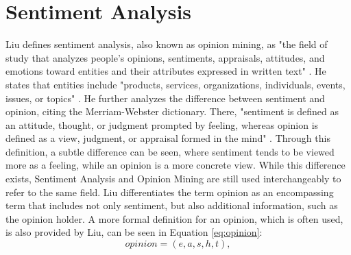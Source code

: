 
\section{Sentiment Analysis}
Liu defines sentiment analysis, also known as opinion mining, as "the field of study that analyzes people's opinions, sentiments, appraisals, attitudes, and emotions toward entities and their attributes expressed in written text" \cite[p.~1]{liu_2015}. He states that entities include "products, services, organizations, individuals, events, issues, or topics" \cite[p.~1]{liu_2015}. He further analyzes the difference between sentiment and opinion, citing the Merriam-Webster dictionary. There, "sentiment is defined as an attitude, thought, or judgment prompted by feeling, whereas opinion is defined as a view, judgment, or appraisal formed in the mind" \cite[p.~2]{liu_2015}. Through this definition, a subtle difference can be seen, where sentiment tends to be viewed more as a feeling, while an opinion is a more concrete view. While this difference exists, Sentiment Analysis and Opinion Mining are still used interchangeably to refer to the same field. Liu differentiates the term opinion as an encompassing term that includes not only sentiment, but also additional information, such as the opinion holder. A more formal definition for an opinion, which is often used, is also provided by Liu, can be seen in Equation \eqref{eq:opinion}:
\begin{equation}
    opinion = (e, a, s, h, t),
    \label{eq:opinion}
\end{equation}
